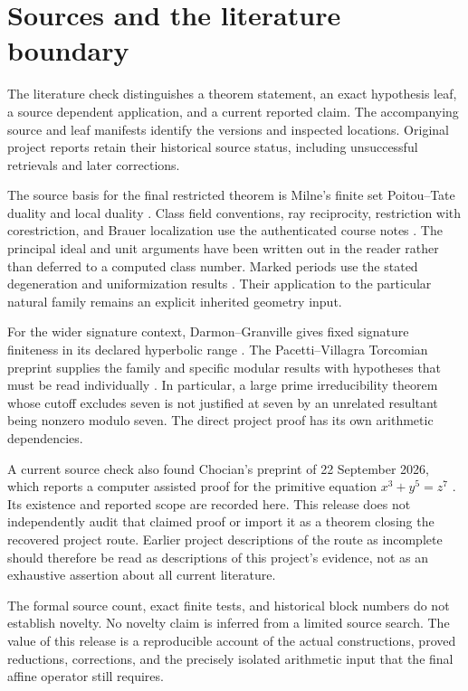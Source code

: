 \section{Sources and the literature boundary}\label{sec:sources}
The literature check distinguishes a theorem statement, an exact hypothesis leaf, a source dependent application, and a current reported claim. The accompanying source and leaf manifests identify the versions and inspected locations. Original project reports retain their historical source status, including unsuccessful retrievals and later corrections.

The source basis for the final restricted theorem is Milne's finite set Poitou--Tate duality and local duality \cite{milneADT2006}. Class field conventions, ray reciprocity, restriction with corestriction, and Brauer localization use the authenticated course notes \cite{milneCFT2020}. The principal ideal and unit arguments have been written out in the reader rather than deferred to a computed class number. Marked periods use the stated degeneration and uniformization results \cite{mumford1972,ichikawa1993,gregory-liedtke2019}. Their application to the particular natural family remains an explicit inherited geometry input.

For the wider signature context, Darmon--Granville gives fixed signature finiteness in its declared hyperbolic range \cite{darmon-granville1995}. The Pacetti--Villagra Torcomian preprint supplies the family and specific modular results with hypotheses that must be read individually \cite{pacetti-villagra2025}. In particular, a large prime irreducibility theorem whose cutoff excludes seven is not justified at seven by an unrelated resultant being nonzero modulo seven. The direct project proof has its own arithmetic dependencies.

A current source check also found Chocian's preprint of 22 September 2026, which reports a computer assisted proof for the primitive equation $x^3+y^5=z^7$ \cite{chocian2026}. Its existence and reported scope are recorded here. This release does not independently audit that claimed proof or import it as a theorem closing the recovered project route. Earlier project descriptions of the route as incomplete should therefore be read as descriptions of this project's evidence, not as an exhaustive assertion about all current literature.

The formal source count, exact finite tests, and historical block numbers do not establish novelty. No novelty claim is inferred from a limited source search. The value of this release is a reproducible account of the actual constructions, proved reductions, corrections, and the precisely isolated arithmetic input that the final affine operator still requires.


